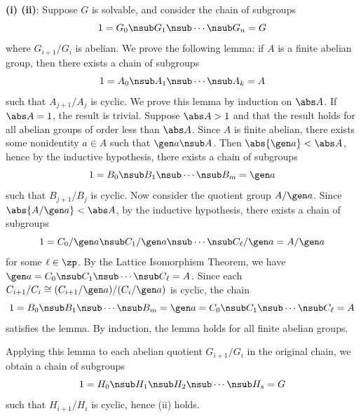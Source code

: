 \begin{sol}
    \textbf{(i) \rightimp (ii)}: Suppose $G$ is solvable, and consider the chain of subgroups
    \[
    	1 = G_0 \nsub G_1 \nsub \cdots \nsub G_n = G
    \]
    where $G_{i + 1}/G_i$ is abelian.
	We prove the following lemma: if $A$ is a finite abelian group, then there exists a chain of subgroups
    \[
    	1 = A_0 \nsub A_1 \nsub \cdots \nsub A_k = A
    \]
    such that $A_{j + 1}/A_j$ is cyclic.
	We prove this lemma by induction on $\abs A$.
	If $\abs A = 1$, the result is trivial.
	Suppose $\abs A > 1$ and that the result holds for all abelian groups of order less than $\abs A$.
	Since $A$ is finite abelian, there exists some nonidentity $a \in A$ such that $\gen a \nsub A$.
	Then $\abs{\gen a} < \abs A$, hence by the inductive hypothesis, there exists a chain of subgroups
    \[
    	1 = B_0 \nsub B_1 \nsub \cdots \nsub B_m = \gen a
    \]
    such that $B_{j + 1}/B_j$ is cyclic.
	Now consider the quotient group $A/\gen a$.
	Since $\abs{A/\gen a} < \abs A$, by the inductive hypothesis, there exists a chain of subgroups
    \[
    	1 = C_0/\gen a \nsub C_1/\gen a \nsub \cdots \nsub C_\ell/\gen a = A/\gen a
    \]
    for some $\ell \in \zp$.
	By the Lattice Isomorphism Theorem, we have $\gen a = C_0 \nsub C_1 \nsub \cdots \nsub C_\ell = A$.
	Since each $C_{i + 1}/C_i \cong (C_{i + 1}/\gen a)/(C_i/\gen a)$ is cyclic, the chain
    \[
    	1 = B_0 \nsub B_1 \nsub \cdots \nsub B_m = \gen a = C_0 \nsub C_1 \nsub \cdots \nsub C_\ell = A
    \]
    satisfies the lemma.
	By induction, the lemma holds for all finite abelian groups. 

    Applying this lemma to each abelian quotient $G_{i + 1}/G_i$ in the original chain, we obtain a chain of subgroups
    \[
    	1 = H_0 \nsub H_1 \nsub H_2 \nsub \cdots \nsub H_s = G
    \]
    such that $H_{i + 1}/H_i$ is cyclic, hence (ii) holds.


\end{sol}
